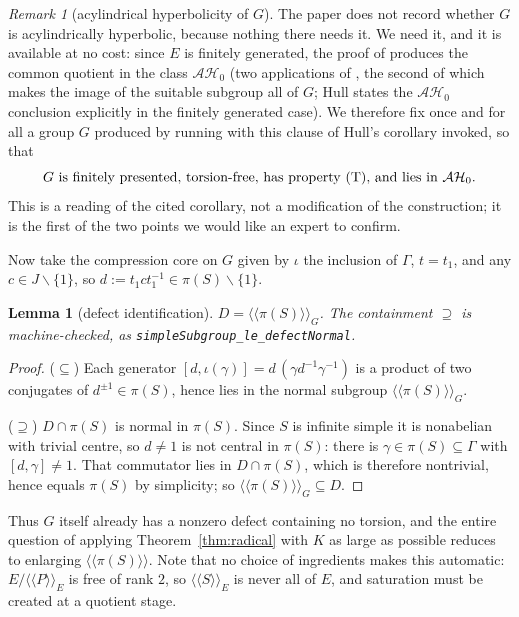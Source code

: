 \documentclass[11pt]{amsart}
\newtheorem{lemma}[theorem]{Lemma}
\theoremstyle{remark}
\newtheorem{remark}[theorem]{Remark}
\theoremstyle{definition}
\newcommand{\ncl}[1]{\langle\!\langle #1\rangle\!\rangle}
\begin{document}
\begin{remark}[acylindrical hyperbolicity of $G$]\label{rem:ah}
The paper \cite{FFF} does not record whether $G$ is acylindrically
hyperbolic, because nothing there needs it.  We need it, and it is available
at no cost: since $E$ is finitely generated, the proof of
\cite[Corollary~7.4]{Hull16} produces the common quotient in the class
$\mathcal{AH}_0$ (two applications of \cite[Theorem~7.1]{Hull16}, the second
of which makes the image of the suitable subgroup all of $G$; Hull states
the $\mathcal{AH}_0$ conclusion explicitly in the finitely generated case).
We therefore fix once and for all a group $G$ produced by running
\cite[\S2]{FFF} with this clause of Hull's corollary invoked, so that
\[
G\ \text{is finitely presented, torsion-free, has property \textup{(T)},
and lies in } \mathcal{AH}_0 .
\]
This is a reading of the cited corollary, not a modification of the
construction; it is the first of the two points we would like an expert to
confirm.
\end{remark}

Now take the compression core on $G$ given by $\iota$ the inclusion of
$\Gamma$, $t=t_1$, and any $c\in J\smallsetminus\{1\}$, so
$d:=t_1ct_1^{-1}\in\pi(S)\smallsetminus\{1\}$.

\begin{lemma}[defect identification]\label{lem:defect}
$D=\ncl{\pi(S)}_G$.  The containment $\supseteq$ is machine-checked, as
\textup{\texttt{simpleSubgroup\_le\_defectNormal}}.
\end{lemma}

\begin{proof}
($\subseteq$) Each generator $[d,\iota(\gamma)]=d\,(\gamma d^{-1}\gamma^{-1})$
is a product of two conjugates of $d^{\pm1}\in\pi(S)$, hence lies in the
normal subgroup $\ncl{\pi(S)}_G$.

($\supseteq$) $D\cap\pi(S)$ is normal in $\pi(S)$.  Since $S$ is infinite
simple it is nonabelian with trivial centre, so $d\neq1$ is not central in
$\pi(S)$: there is $\gamma\in\pi(S)\subseteq\Gamma$ with $[d,\gamma]\neq1$.
That commutator lies in $D\cap\pi(S)$, which is therefore nontrivial, hence
equals $\pi(S)$ by simplicity; so $\ncl{\pi(S)}_G\subseteq D$.
\end{proof}

Thus $G$ itself already has a nonzero defect containing no torsion, and the
entire question of applying Theorem~\ref{thm:radical} with $K$ as large as
possible reduces to enlarging $\ncl{\pi(S)}$.  Note that no choice of
ingredients makes this automatic: $E/\ncl{P}_E$ is free of rank $2$, so
$\ncl{S}_E$ is never all of $E$, and saturation must be created at a
quotient stage.
\end{document}
